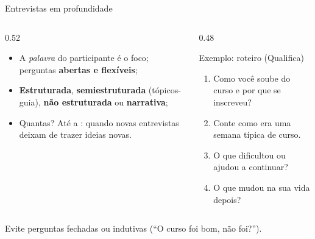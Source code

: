 \begin{frame}{Entrevistas em profundidade}
  \begin{columns}[T]
    \begin{column}{0.52\textwidth}
      \footnotesize
      \begin{itemize}
        \item A \emph{palavra} do participante é o foco; perguntas \textbf{abertas e flexíveis};
        \item \textbf{Estruturada}, \textbf{semiestruturada} (tópicos-guia), \textbf{não estruturada} ou \textbf{narrativa};
        \item Quantas? Até a : quando novas entrevistas deixam de trazer ideias novas.
      \end{itemize}
    \end{column}
    \begin{column}{0.48\textwidth}
      \begin{exerciciobox}{Exemplo: roteiro (Qualifica)}
        \scriptsize
        \begin{enumerate}
          \item Como você soube do curso e por que se inscreveu?
          \item Conte como era uma semana típica de curso.
          \item O que dificultou ou ajudou a continuar?
          \item O que mudou na sua vida depois?
        \end{enumerate}
      \end{exerciciobox}
    \end{column}
  \end{columns}
  \vspace{0.2cm}
  \footnotesize \alert{Evite} perguntas fechadas ou indutivas (``O curso foi bom, não foi?'').
\end{frame}

